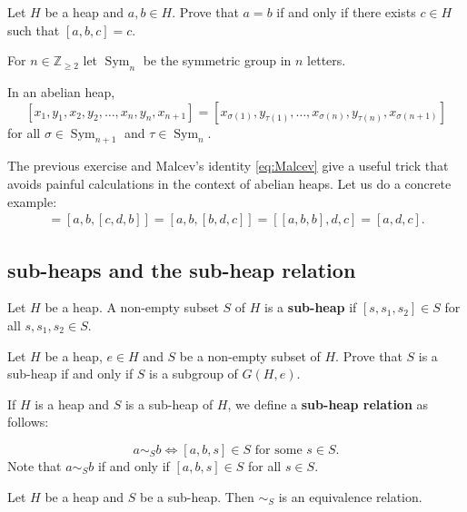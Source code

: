 \documentclass{svmult}
\newcommand{\Z}{\mathbb{Z}}
\newcommand{\Sym}{\operatorname{Sym}}
\begin{document}
\begin{exercise}
\label{xca:equality}
    Let $H$ be a heap and $a,b\in H$. Prove that
    $a=b$ if and only if there exists $c\in H$ such that 
    $[a,b,c]=c$.
\end{exercise}

For $n\in\Z_{\geq2}$ let 
$\Sym_n$ be the symmetric group in $n$ letters. 

\begin{exercise}
\label{xca:abelian}
    In an abelian heap,
    \[
    [x_1,y_1,x_2,y_2,\dots,x_n,y_n,x_{n+1}]=[x_{\sigma(1)},y_{\tau(1)},\dots,x_{\sigma(n)},y_{\tau(n)},x_{\sigma(n+1)}]
    \]
    for all $\sigma\in\Sym_{n+1}$ and $\tau\in\Sym_n$. 
\end{exercise}

The previous exercise and Malcev's identity \eqref{eq:Malcev}
give a useful trick that avoids painful calculations in the context of abelian heaps. 
Let us do a concrete example:
\begin{align*}
    [a,b,c,d,b]=[a,b,[c,d,b]]=[a,b,[b,d,c]]=[[a,b,b],d,c]=[a,d,c].
\end{align*}

\subsection{sub-heaps and the sub-heap relation}

\begin{definition}
    Let $H$ be a heap. 
    A non-empty subset $S$ of $H$ is a \textbf{sub-heap} if $[s,s_1,s_2]\in S$ for all 
    $s,s_1,s_2\in S$. 
\end{definition}

\begin{exercise}
    Let $H$ be a heap, $e\in H$ and $S$ be a non-empty subset of $H$. 
    Prove that $S$ is a sub-heap if and only if $S$ is a subgroup of $G(H,e)$. 
\end{exercise}

If $H$ is a heap and $S$ is a sub-heap of $H$, we define 
a \textbf{sub-heap relation} as follows:

\[
a\sim_S b\Longleftrightarrow [a,b,s]\in S\text{ for some $s\in S$}.
\]
Note that $a\sim_Sb$ if and only if $[a,b,s]\in S$ for all $s\in S$. 

\begin{proposition}
    Let $H$ be a heap and $S$ be a sub-heap. Then $\sim_S$ is an equivalence relation. 
\end{proposition}
\end{document}
